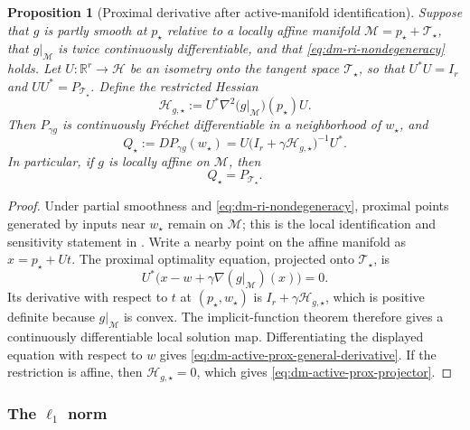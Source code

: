 \documentclass[10pt,leqno]{amsart}
\numberwithin{equation}{section}
\numberwithin{algorithm}{section}
\newtheorem{proposition}[theorem]{Proposition}
\theoremstyle{remark}
\newcommand{\Hcal}{\mathcal{H}}
\newcommand{\R}{\mathbb{R}}
\newcommand{\grad}{\nabla}
\begin{document}
\begin{proposition}[Proximal derivative after active-manifold identification]
\label{prop:dm-active-prox-derivative}
Suppose that \(g\) is partly smooth at \(p_\star\) relative to a locally affine manifold
\(
 \mathcal M=p_\star+\mathcal T_\star
\), that \(g|_{\mathcal M}\) is twice continuously differentiable, and that \eqref{eq:dm-ri-nondegeneracy} holds.  Let
\(
 U:\R^r\to\Hcal
\)
be an isometry onto the tangent space \(\mathcal T_\star\), so that
\(
 U^*U=I_r
\)
and
\(
 UU^*=P_{\mathcal T_\star}
\).  Define the restricted Hessian
\begin{equation}
\label{eq:dm-active-hessian-g}
    \mathcal H_{g,\star}
      :=U^*\grad^2\!\bigl(g|_{\mathcal M}\bigr)(p_\star)U.
\end{equation}
Then \(P_{\gamma g}\) is continuously Fr\'echet differentiable in a neighborhood of \(w_\star\), and
\begin{equation}
\label{eq:dm-active-prox-general-derivative}
    Q_\star:=DP_{\gamma g}(w_\star)
       =U\bigl(I_r+\gamma\mathcal H_{g,\star}\bigr)^{-1}U^*.
\end{equation}
In particular, if \(g\) is locally affine on \(\mathcal M\), then
\begin{equation}
\label{eq:dm-active-prox-projector}
    Q_\star=P_{\mathcal T_\star}.
\end{equation}
\end{proposition}

\begin{proof}
Under partial smoothness and \eqref{eq:dm-ri-nondegeneracy}, proximal points generated by inputs near \(w_\star\) remain on \(\mathcal M\); this is the local identification and sensitivity statement in \cite{Lewis2002,HangSarabi2025}.  Write a nearby point on the affine manifold as
\(
 x=p_\star+Ut
\).
The proximal optimality equation, projected onto \(\mathcal T_\star\), is
\[
   U^*\bigl(x-w+\gamma\grad(g|_{\mathcal M})(x)\bigr)=0.
\]
Its derivative with respect to \(t\) at \((p_\star,w_\star)\) is
\(
 I_r+\gamma\mathcal H_{g,\star}
\), which is positive definite because \(g|_{\mathcal M}\) is convex.  The implicit-function theorem therefore gives a continuously differentiable local solution map.  Differentiating the displayed equation with respect to \(w\) gives \eqref{eq:dm-active-prox-general-derivative}.  If the restriction is affine, then \(\mathcal H_{g,\star}=0\), which gives \eqref{eq:dm-active-prox-projector}.
\end{proof}

\subsubsection{The \texorpdfstring{$\ell_1$}{l1} norm}
\end{document}
